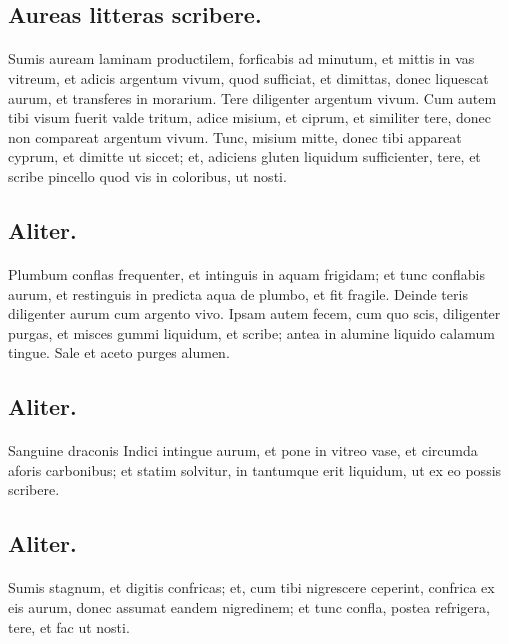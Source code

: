 \documentclass[a4paper, 11pt, oneside, polutonikogreek, italian]{article}
\begin{document}
\subsection{Aureas litteras scribere.}
\paragraph{}
Sumis auream laminam productilem, forficabis ad minutum, et mittis in vas vitreum, et adicis argentum vivum, quod sufficiat, et dimittas, donec liquescat aurum, et transferes in morarium. Tere diligenter argentum vivum. Cum autem tibi visum fuerit valde tritum, adice misium, et ciprum, et similiter tere, donec non compareat argentum vivum. Tunc, misium mitte, donec tibi appareat cyprum, et dimitte ut siccet; et, adiciens gluten liquidum sufficienter, tere, et scribe pincello quod vis in coloribus, ut nosti.

\subsection{Aliter.}
\paragraph{}
Plumbum conflas frequenter, et intinguis in aquam frigidam; et tunc conflabis aurum, et restinguis in predicta aqua de plumbo, et fit fragile. Deinde teris diligenter aurum cum argento vivo. Ipsam autem fecem, cum quo scis, diligenter purgas, et misces gummi liquidum, et scribe; antea in alumine liquido calamum tingue. Sale et aceto purges alumen.

\subsection{Aliter.}
\paragraph{}
Sanguine draconis Indici intingue aurum, et pone in vitreo vase, et circumda aforis carbonibus; et statim solvitur, in tantumque erit liquidum, ut ex eo possis scribere.

\subsection{Aliter.}
\paragraph{}
Sumis stagnum, et digitis confricas; et, cum tibi nigrescere ceperint, confrica ex eis aurum, donec assumat eandem nigredinem; et tunc confla, postea refrigera, tere, et fac ut nosti.
\end{document}
